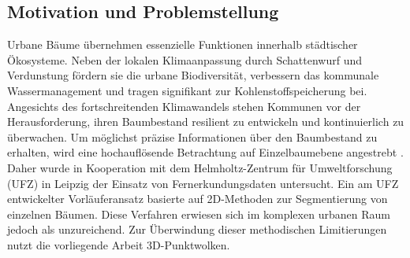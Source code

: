 \subsection{Motivation und Problemstellung}

Urbane Bäume übernehmen essenzielle Funktionen innerhalb städtischer Ökosysteme. Neben der lokalen Klimaanpassung durch Schattenwurf und Verdunstung fördern sie die urbane Biodiversität, verbessern das kommunale Wassermanagement und tragen signifikant zur Kohlenstoffspeicherung bei. Angesichts des fortschreitenden Klimawandels stehen Kommunen vor der Herausforderung, ihren Baumbestand resilient zu entwickeln und kontinuierlich zu überwachen. Um möglichst präzise Informationen über den Baumbestand zu erhalten, wird eine hochauflösende Betrachtung auf Einzelbaumebene angestrebt \cite{munzingerMappingUrbanForest2022}. Daher wurde in Kooperation mit dem Helmholtz-Zentrum für Umweltforschung (\ac{UFZ}) in Leipzig der Einsatz von Fernerkundungsdaten untersucht. Ein am UFZ entwickelter Vorläuferansatz basierte auf 2D-Methoden zur Segmentierung von einzelnen Bäumen. Diese Verfahren erwiesen sich im komplexen urbanen Raum jedoch als unzureichend. Zur Überwindung dieser methodischen Limitierungen nutzt die vorliegende Arbeit 3D-Punktwolken.
